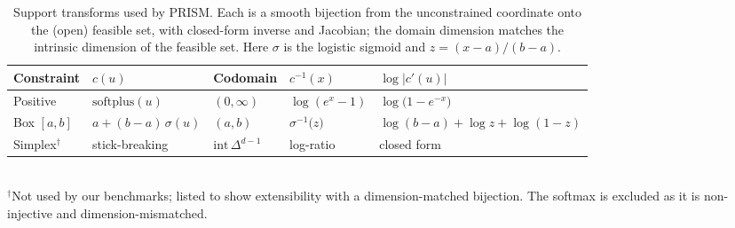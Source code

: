 \begin{table}[t]
\centering
\caption{Support transforms used by PRISM. Each is a smooth bijection from the
unconstrained coordinate onto the (open) feasible set, with closed-form inverse
and Jacobian; the domain dimension matches the intrinsic dimension of the
feasible set. Here $\sigma$ is the logistic sigmoid and $z=(x-a)/(b-a)$.}
\label{tab:transforms}
\begin{tabular}{lllll}
\toprule
Constraint & $c(u)$ & Codomain & $c^{-1}(x)$ & $\log|c'(u)|$ \\
\midrule
Positive & $\mathrm{softplus}(u)$ & $(0,\infty)$ & $\log(e^{x}-1)$ & $\log\!\big(1-e^{-x}\big)$ \\
Box $[a,b]$ & $a+(b-a)\,\sigma(u)$ & $(a,b)$ & $\sigma^{-1}\!\big(z\big)$ & $\log(b-a)+\log z+\log(1-z)$ \\
Simplex$^{\dagger}$ & stick-breaking & $\mathrm{int}\,\Delta^{d-1}$ & log-ratio & closed form \\
\bottomrule
\end{tabular}
\\[3pt]
{\footnotesize $^{\dagger}$Not used by our benchmarks; listed to show
extensibility with a dimension-matched bijection. The softmax is excluded as it
is non-injective and dimension-mismatched.}
\end{table}
